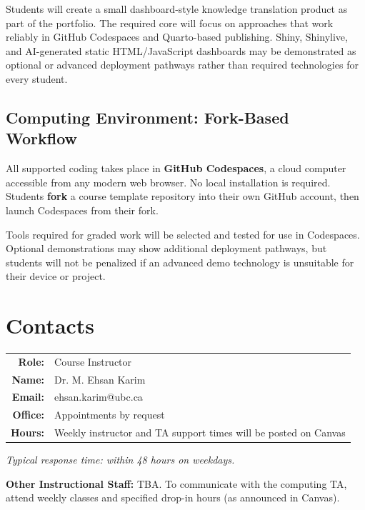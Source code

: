 \documentclass[
  letterpaper,
  DIV=11,
  numbers=noendperiod,
  oneside]{scrreprt}
\begin{document}
Students will create a small dashboard-style knowledge translation
product as part of the portfolio. The required core will focus on
approaches that work reliably in GitHub Codespaces and Quarto-based
publishing. Shiny, Shinylive, and AI-generated static HTML/JavaScript
dashboards may be demonstrated as optional or advanced deployment
pathways rather than required technologies for every student.

\subsection{Computing Environment: Fork-Based
Workflow}\label{computing-environment-fork-based-workflow}

All supported coding takes place in \textbf{GitHub Codespaces}, a cloud
computer accessible from any modern web browser. No local installation
is required. Students \textbf{fork} a course template repository into
their own GitHub account, then launch Codespaces from their fork.

Tools required for graded work will be selected and tested for use in
Codespaces. Optional demonstrations may show additional deployment
pathways, but students will not be penalized if an advanced demo
technology is unsuitable for their device or project.

\section{Contacts}\label{contacts}

\begin{tabular}{>{}r>{\raggedright\arraybackslash}p{10cm}}
\toprule
\textcolor{brandblue}{\textbf{Role:}} & Course Instructor\\
\textcolor{brandblue}{\textbf{Name:}} & Dr. M. Ehsan Karim\\
\textcolor{brandblue}{\textbf{Email:}} & ehsan.karim@ubc.ca\\
\textcolor{brandblue}{\textbf{Office:}} & Appointments by request\\
\textcolor{brandblue}{\textbf{Hours:}} & Weekly instructor and TA support times will be posted on Canvas\\
\bottomrule
\end{tabular}

\emph{Typical response time: within 48 hours on weekdays.}

\textbf{Other Instructional Staff:} TBA. To communicate with the
computing TA, attend weekly classes and specified drop-in hours (as
announced in Canvas).
\end{document}
